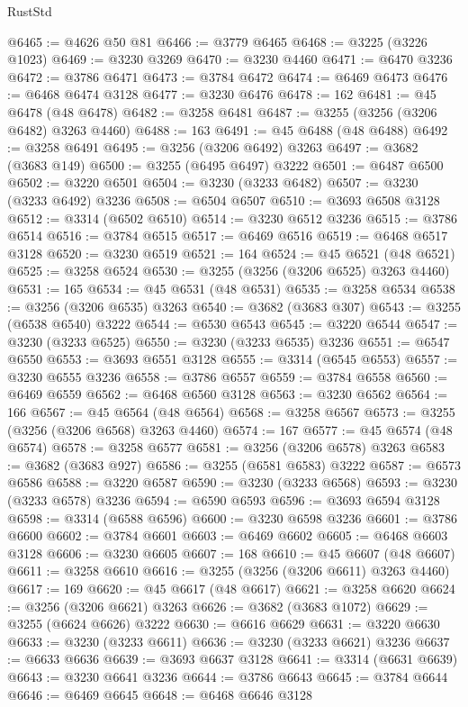\begin{lexlean}{RustStd}
\begin{coremodule}
{\begin{coremodule}
{{{{{{{{{{{{{{{{{{{{{{{{{{{{{{{{{{{{{@6465 := @4626 @50 @81
@6466 := @3779 @6465
@6468 := @3225 (@3226 @1023)
@6469 := @3230 @3269
@6470 := @3230 @4460
@6471 := @6470 @3236
@6472 := @3786 @6471
@6473 := @3784 @6472
@6474 := @6469 @6473
@6476 := @6468 @6474 @3128
@6477 := @3230 @6476
@6478 := 162
@6481 := @45 @6478 (@48 @6478)
@6482 := @3258 @6481
@6487 := @3255 (@3256 (@3206 @6482) @3263 @4460)
@6488 := 163
@6491 := @45 @6488 (@48 @6488)
@6492 := @3258 @6491
@6495 := @3256 (@3206 @6492) @3263
@6497 := @3682 (@3683 @149)
@6500 := @3255 (@6495 @6497) @3222
@6501 := @6487 @6500
@6502 := @3220 @6501
@6504 := @3230 (@3233 @6482)
@6507 := @3230 (@3233 @6492) @3236
@6508 := @6504 @6507
@6510 := @3693 @6508 @3128
@6512 := @3314 (@6502 @6510)
@6514 := @3230 @6512 @3236
@6515 := @3786 @6514
@6516 := @3784 @6515
@6517 := @6469 @6516
@6519 := @6468 @6517 @3128
@6520 := @3230 @6519
@6521 := 164
@6524 := @45 @6521 (@48 @6521)
@6525 := @3258 @6524
@6530 := @3255 (@3256 (@3206 @6525) @3263 @4460)
@6531 := 165
@6534 := @45 @6531 (@48 @6531)
@6535 := @3258 @6534
@6538 := @3256 (@3206 @6535) @3263
@6540 := @3682 (@3683 @307)
@6543 := @3255 (@6538 @6540) @3222
@6544 := @6530 @6543
@6545 := @3220 @6544
@6547 := @3230 (@3233 @6525)
@6550 := @3230 (@3233 @6535) @3236
@6551 := @6547 @6550
@6553 := @3693 @6551 @3128
@6555 := @3314 (@6545 @6553)
@6557 := @3230 @6555 @3236
@6558 := @3786 @6557
@6559 := @3784 @6558
@6560 := @6469 @6559
@6562 := @6468 @6560 @3128
@6563 := @3230 @6562
@6564 := 166
@6567 := @45 @6564 (@48 @6564)
@6568 := @3258 @6567
@6573 := @3255 (@3256 (@3206 @6568) @3263 @4460)
@6574 := 167
@6577 := @45 @6574 (@48 @6574)
@6578 := @3258 @6577
@6581 := @3256 (@3206 @6578) @3263
@6583 := @3682 (@3683 @927)
@6586 := @3255 (@6581 @6583) @3222
@6587 := @6573 @6586
@6588 := @3220 @6587
@6590 := @3230 (@3233 @6568)
@6593 := @3230 (@3233 @6578) @3236
@6594 := @6590 @6593
@6596 := @3693 @6594 @3128
@6598 := @3314 (@6588 @6596)
@6600 := @3230 @6598 @3236
@6601 := @3786 @6600
@6602 := @3784 @6601
@6603 := @6469 @6602
@6605 := @6468 @6603 @3128
@6606 := @3230 @6605
@6607 := 168
@6610 := @45 @6607 (@48 @6607)
@6611 := @3258 @6610
@6616 := @3255 (@3256 (@3206 @6611) @3263 @4460)
@6617 := 169
@6620 := @45 @6617 (@48 @6617)
@6621 := @3258 @6620
@6624 := @3256 (@3206 @6621) @3263
@6626 := @3682 (@3683 @1072)
@6629 := @3255 (@6624 @6626) @3222
@6630 := @6616 @6629
@6631 := @3220 @6630
@6633 := @3230 (@3233 @6611)
@6636 := @3230 (@3233 @6621) @3236
@6637 := @6633 @6636
@6639 := @3693 @6637 @3128
@6641 := @3314 (@6631 @6639)
@6643 := @3230 @6641 @3236
@6644 := @3786 @6643
@6645 := @3784 @6644
@6646 := @6469 @6645
@6648 := @6468 @6646 @3128
}}}}}}}}}}}}}}}}}}}}}}}}}}}}}}}}}}}}}
\end{coremodule}}
\end{coremodule}
\end{lexlean}
